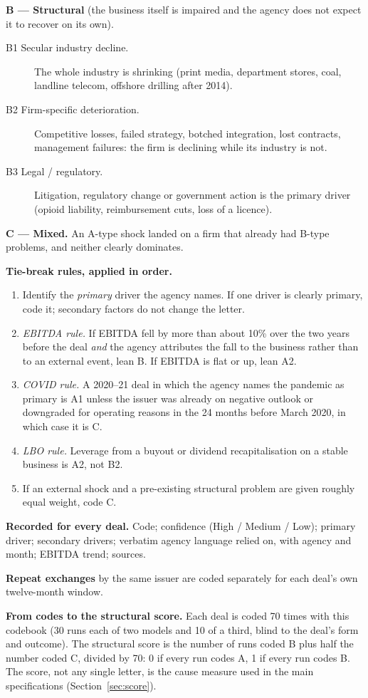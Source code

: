 \documentclass[12pt]{article}
\begin{document}
\noindent\textbf{B --- Structural} (the business itself is impaired and the agency does not expect it to recover on its own).
\begin{description}
  \item[B1 Secular industry decline.] The whole industry is shrinking (print media, department stores, coal, landline telecom, offshore drilling after 2014).
  \item[B2 Firm-specific deterioration.] Competitive losses, failed strategy, botched integration, lost contracts, management failures: the firm is declining while its industry is not.
  \item[B3 Legal / regulatory.] Litigation, regulatory change or government action is the primary driver (opioid liability, reimbursement cuts, loss of a licence).
\end{description}

\noindent\textbf{C --- Mixed.} An A-type shock landed on a firm that already had B-type problems, and neither clearly dominates.

\medskip\noindent\textbf{Tie-break rules, applied in order.}
\begin{enumerate}
  \item Identify the \emph{primary} driver the agency names. If one driver is clearly primary, code it; secondary factors do not change the letter.
  \item \emph{EBITDA rule.} If EBITDA fell by more than about 10\% over the two years before the deal \emph{and} the agency attributes the fall to the business rather than to an external event, lean B. If EBITDA is flat or up, lean A2.
  \item \emph{COVID rule.} A 2020--21 deal in which the agency names the pandemic as primary is A1 unless the issuer was already on negative outlook or downgraded for operating reasons in the 24 months before March 2020, in which case it is C.
  \item \emph{LBO rule.} Leverage from a buyout or dividend recapitalisation on a stable business is A2, not B2.
  \item If an external shock and a pre-existing structural problem are given roughly equal weight, code C.
\end{enumerate}

\noindent\textbf{Recorded for every deal.} Code; confidence (High / Medium / Low); primary driver; secondary drivers; verbatim agency language relied on, with agency and month; EBITDA trend; sources.

\noindent\textbf{Repeat exchanges} by the same issuer are coded separately for each deal's own twelve-month window.

\medskip\noindent\textbf{From codes to the structural score.} Each deal is coded 70 times with this codebook (30 runs each of two models and 10 of a third, blind to the deal's form and outcome). The structural score is the number of runs coded B plus half the number coded C, divided by 70: 0 if every run codes A, 1 if every run codes B. The score, not any single letter, is the cause measure used in the main specifications (Section~\ref{sec:score}).
\end{document}
